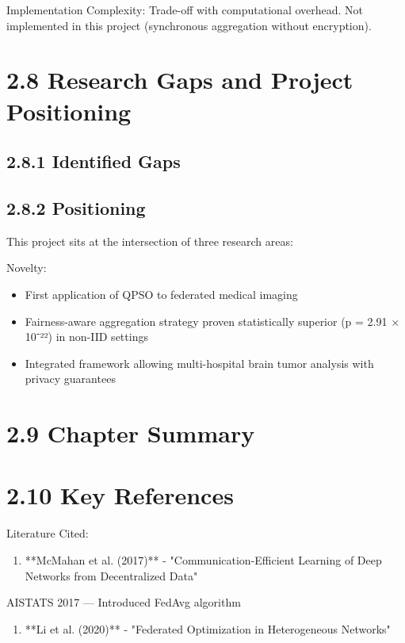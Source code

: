 Implementation Complexity: Trade-off with computational overhead. Not implemented in this project (synchronous aggregation without encryption).


\section{2.8 Research Gaps and Project Positioning}

\subsection{2.8.1 Identified Gaps}

\subsection{2.8.2 Positioning}
This project sits at the intersection of three research areas:

Novelty:

\begin{itemize}
  \item First application of QPSO to federated medical imaging
  \item Fairness-aware aggregation strategy proven statistically superior (p = 2.91 × 10⁻²²) in non-IID settings
  \item Integrated framework allowing multi-hospital brain tumor analysis with privacy guarantees
\end{itemize}


\section{2.9 Chapter Summary}

\section{2.10 Key References}
Literature Cited:

\begin{enumerate}
  \item **McMahan et al. (2017)** - "Communication-Efficient Learning of Deep Networks from Decentralized Data"
\end{enumerate}

AISTATS 2017 — Introduced FedAvg algorithm

\begin{enumerate}
  \item **Li et al. (2020)** - "Federated Optimization in Heterogeneous Networks"
\end{enumerate}


